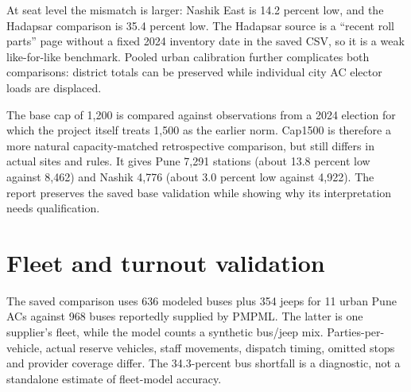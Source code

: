 \documentclass[11pt,a4paper,oneside]{report}
\newcommand{\source}[1]{\par\nopagebreak[4]{\footnotesize\color{teal}Evidence: #1.}\par}
\begin{document}
At seat level the mismatch is larger: Nashik East is 14.2 percent low, and the Hadapsar comparison is 35.4 percent low. The Hadapsar source is a ``recent roll parts'' page without a fixed 2024 inventory date in the saved CSV, so it is a weak like-for-like benchmark. Pooled urban calibration further complicates both comparisons: district totals can be preserved while individual city AC elector loads are displaced.

The base cap of 1,200 is compared against observations from a 2024 election for which the project itself treats 1,500 as the earlier norm. Cap1500 is therefore a more natural capacity-matched retrospective comparison, but still differs in actual sites and rules. It gives Pune 7,291 stations (about 13.8 percent low against 8,462) and Nashik 4,776 (about 3.0 percent low against 4,922). The report preserves the saved base validation while showing why its interpretation needs qualification.
\source{[S9], [S12]}

\section{Fleet and turnout validation}
The saved comparison uses 636 modeled buses plus 354 jeeps for 11 urban Pune ACs against 968 buses reportedly supplied by PMPML. The latter is one supplier's fleet, while the model counts a synthetic bus/jeep mix. Parties-per-vehicle, actual reserve vehicles, staff movements, dispatch timing, omitted stops and provider coverage differ. The 34.3-percent bus shortfall is a diagnostic, not a standalone estimate of fleet-model accuracy.
\end{document}

